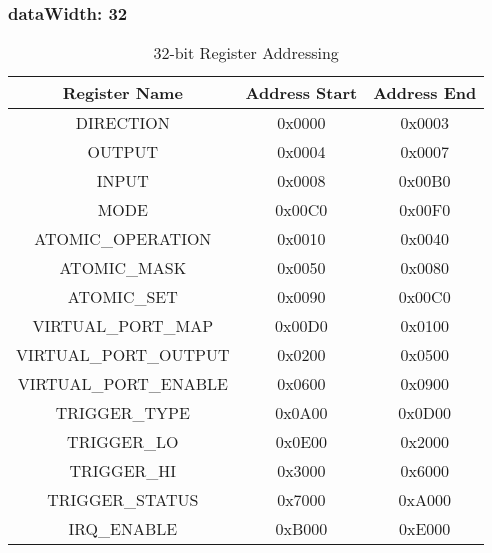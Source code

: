\subsubsection{dataWidth: 32}
\begin{table}[h]
  \centering
  \begin{tabular}{|c|c|c|}
      \hline
      \textbf{Register Name} & \textbf{Address Start} & \textbf{Address End} \\ \hline
      DIRECTION & 0x0000 & 0x0003 \\ \hline
      OUTPUT & 0x0004 & 0x0007 \\ \hline
      INPUT & 0x0008 & 0x00B0 \\ \hline
      MODE & 0x00C0 & 0x00F0 \\ \hline
      ATOMIC\_OPERATION & 0x0010 & 0x0040 \\ \hline
      ATOMIC\_MASK & 0x0050 & 0x0080 \\ \hline
      ATOMIC\_SET & 0x0090 & 0x00C0 \\ \hline
      VIRTUAL\_PORT\_MAP & 0x00D0 & 0x0100 \\ \hline
      VIRTUAL\_PORT\_OUTPUT & 0x0200 & 0x0500 \\ \hline
      VIRTUAL\_PORT\_ENABLE & 0x0600 & 0x0900\\ \hline
      TRIGGER\_TYPE & 0x0A00 & 0x0D00 \\ \hline
      TRIGGER\_LO & 0x0E00 & 0x2000 \\ \hline
      TRIGGER\_HI & 0x3000 & 0x6000 \\ \hline
      TRIGGER\_STATUS & 0x7000 & 0xA000 \\ \hline
      IRQ\_ENABLE & 0xB000 & 0xE000\\ \hline
  \end{tabular}
  \caption{32-bit Register Addressing}
\end{table}

